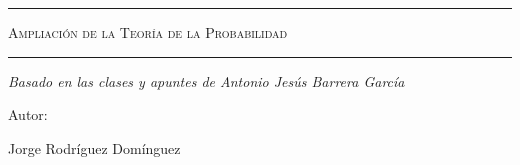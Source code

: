 \begin{titlepage}
\centering
{\bfseries\LARGE \ \par}
\vspace{1cm}
{\scshape\Large \ \par}
\vspace{3cm}
\rule{\linewidth}{0.5mm}
{\scshape\Huge Ampliación de la Teoría de la Probabilidad \par}
\rule{\linewidth}{0.5mm} \par
\vspace{3cm}
{\itshape\Large Basado en las clases y apuntes de Antonio Jesús Barrera García \par}
\vfill
\begin{figure}[H]
    \centering
\end{figure}
{\Large Autor: \par}
{\Large Jorge Rodríguez Domínguez \par}
\vfill
\end{titlepage}
\tableofcontents